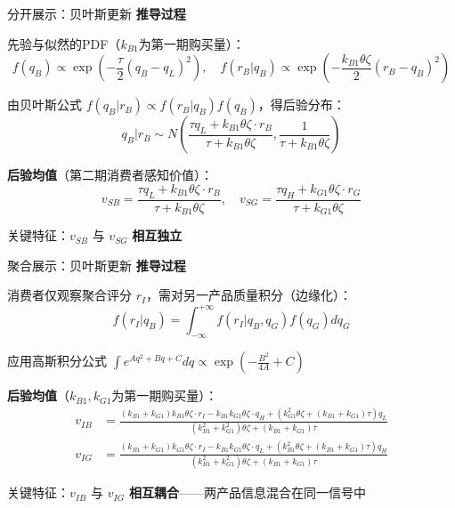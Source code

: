 \documentclass[aspectratio=169,10pt]{beamer}
\newcommand{\pos}[1]{\textcolor{positive}{#1}}
\newcommand{\con}[1]{\textcolor{negative}{#1}}
\newcommand{\HL}[1]{\textcolor{emphasis}{#1}}
\begin{document}
\begin{frame}{分开展示：贝叶斯更新}
\textbf{推导过程}

先验与似然的PDF（$k_{B1}$为第一期购买量）：
\[
f(q_B) \propto \exp\left(-\frac{\tau}{2}(q_B - q_L)^2\right), \quad
f(r_B|q_B) \propto \exp\left(-\frac{k_{B1}\theta\zeta}{2}(r_B - q_B)^2\right)
\]

由贝叶斯公式 $f(q_B|r_B) \propto f(r_B|q_B)f(q_B)$，得\pos{后验分布}：
\[
q_B|r_B \sim N\left(\frac{\tau q_L + k_{B1}\theta\zeta \cdot r_B}{\tau + k_{B1}\theta\zeta}, \frac{1}{\tau + k_{B1}\theta\zeta}\right)
\]

\vspace{6pt}
\textbf{后验均值}（第二期消费者感知价值）：
\[
v_{SB} = \frac{\tau q_L + k_{B1}\theta\zeta \cdot r_B}{\tau + k_{B1}\theta\zeta}, \quad
v_{SG} = \frac{\tau q_H + k_{G1}\theta\zeta \cdot r_G}{\tau + k_{G1}\theta\zeta}
\]

\vspace{4pt}
\HL{关键特征}：$v_{SB}$ 与 $v_{SG}$ \textbf{相互独立}
\end{frame}

\begin{frame}{聚合展示：贝叶斯更新}
\textbf{推导过程}

消费者仅观察聚合评分 $r_I$，需对另一产品质量积分（边缘化）：
\[
f(r_I|q_B) = \int_{-\infty}^{+\infty} f(r_I|q_B, q_G)f(q_G)dq_G
\]

应用\HL{高斯积分公式} $\int e^{Aq^2 + Bq + C}dq \propto \exp\left(-\frac{B^2}{4A} + C\right)$

\vspace{6pt}
\textbf{后验均值}（$k_{B1}, k_{G1}$为第一期购买量）：
\begin{align*}
v_{IB} &= \frac{(k_{B1}+k_{G1})k_{B1}\theta\zeta \cdot r_I - k_{B1}k_{G1}\theta\zeta \cdot q_H + (k_{G1}^2\theta\zeta + (k_{B1}+k_{G1})\tau)q_L}{(k_{B1}^2+k_{G1}^2)\theta\zeta + (k_{B1}+k_{G1})\tau}\\[4pt]
v_{IG} &= \frac{(k_{B1}+k_{G1})k_{G1}\theta\zeta \cdot r_I - k_{B1}k_{G1}\theta\zeta \cdot q_L + (k_{B1}^2\theta\zeta + (k_{B1}+k_{G1})\tau)q_H}{(k_{B1}^2+k_{G1}^2)\theta\zeta + (k_{B1}+k_{G1})\tau}
\end{align*}

\vspace{4pt}
\con{关键特征}：$v_{IB}$ 与 $v_{IG}$ \textbf{相互耦合}——两产品信息混合在同一信号中
\end{frame}
\end{document}
